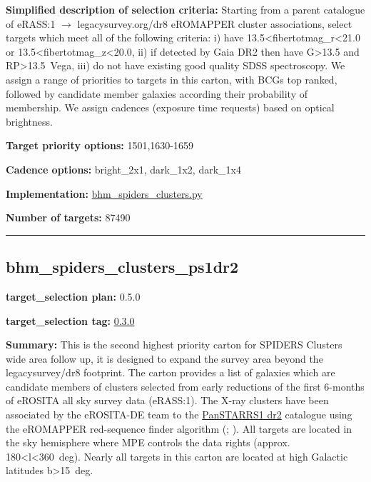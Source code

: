 \noindent\textbf{Simplified description of selection criteria:} Starting from a
parent catalogue of eRASS:1 $\rightarrow$ legacysurvey.org/dr8 eROMAPPER cluster
associations, select targets which meet all of the following criteria:
i) have 13.5\textless{}fibertotmag\_r\textless{}21.0 or
13.5\textless{}fibertotmag\_z\textless{}20.0, ii) if detected by Gaia
DR2 then have G\textgreater{}13.5 and RP\textgreater{}13.5~Vega, iii) do
not have existing good quality SDSS spectroscopy. We assign a range of
priorities to targets in this carton, with BCGs top ranked, followed by
candidate member galaxies according their probability of membership. We
assign cadences (exposure time requests) based on optical brightness.


\noindent\textbf{Target priority options:} 1501,1630-1659

\noindent\textbf{Cadence options:} bright\_2x1, dark\_1x2, dark\_1x4

\noindent\textbf{Implementation:}
\href{https://github.com/sdss/target_selection/blob/0.3.0/python/target_selection/cartons/bhm_spiders_clusters.py}{bhm\_spiders\_clusters.py}

\noindent\textbf{Number of targets:} 87490

\begin{center}\rule{0.5\linewidth}{0.5pt}\end{center}

\hypertarget{bhm_spiders_clusters_ps1dr2_plan0.5.0}{%
\subsection{bhm\_spiders\_clusters\_ps1dr2}\label{bhm_spiders_clusters_ps1dr2_plan0.5.0}}

\noindent\textbf{target\_selection plan:} 0.5.0

\noindent\textbf{target\_selection tag:}
\href{https://github.com/sdss/target_selection/tree/0.3.0/}{0.3.0}

\noindent\textbf{Summary:} This is the second highest priority carton for SPIDERS
Clusters wide area follow up, it is designed to expand the survey area
beyond the legacysurvey/dr8 footprint. The carton provides a list of
galaxies which are candidate members of clusters selected from early
reductions of the first 6-months of eROSITA all sky survey data
(eRASS:1). The X-ray clusters have been associated by the eROSITA-DE
team to the
\href{https://outerspace.stsci.edu/display/PANSTARRS/}{PanSTARRS1 dr2}
catalogue using the eROMAPPER red-sequence finder algorithm
(\citealt{Rykoff2014};
\citealt{IderChitham2020}). All targets are located in the sky hemisphere
where MPE controls the data rights (approx.
180\textless{}l\textless{}360~deg). Nearly all targets in this carton
are located at high Galactic latitudes
\textbar{}b\textbar{}\textgreater{}15~deg.

